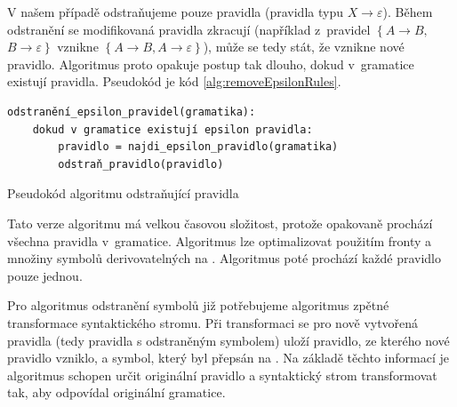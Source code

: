 	V našem případě odstraňujeme pouze \EpsS pravidla (pravidla typu $X\rightarrow\varepsilon$). Během odstranění se modifikovaná pravidla zkracují (například z~pravidel $\left\{\right.A\rightarrow B,$ $B\rightarrow\varepsilon\left.\right\}$ vznikne $\left\{A\rightarrow B, A\rightarrow\varepsilon\right\}$), může se tedy stát, že vznikne nové \EpsS pravidlo. Algoritmus proto opakuje postup tak dlouho, dokud v~gramatice existují \EpsS pravidla. Pseudokód je kód \ref{alg:removeEpsilonRules}.
	
	\begin{listing}[h]
		\begin{verbatim}
odstranění_epsilon_pravidel(gramatika):
	dokud v gramatice existují epsilon pravidla:
		pravidlo = najdi_epsilon_pravidlo(gramatika)
		odstraň_pravidlo(pravidlo)
		\end{verbatim}
		\caption{Pseudokód algoritmu odstraňující \EpsS pravidla}
		\label{alg:removeEpsilonRules}
	\end{listing}
	
	Tato verze algoritmu má velkou časovou složitost, protože opakovaně prochází všechna pravidla v~gramatice. Algoritmus lze optimalizovat použitím fronty a množiny symbolů derivovatelných na \Eps. Algoritmus poté prochází každé pravidlo pouze jednou.
	
	
	Pro algoritmus odstranění \EpsS symbolů již potřebujeme algoritmus zpětné transformace syntaktického stromu. Při transformaci se pro nově vytvořená pravidla (tedy pravidla s odstraněným \EpsS symbolem) uloží pravidlo, ze kterého nové pravidlo vzniklo, a symbol, který byl přepsán na \Eps. Na základě těchto informací je algoritmus schopen určit originální pravidlo a syntaktický strom transformovat tak, aby odpovídal originální gramatice.
	
